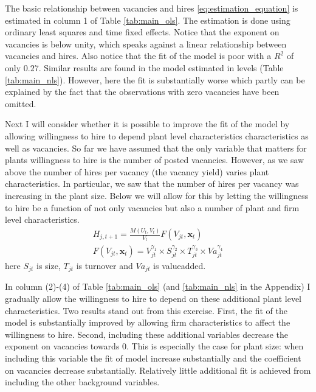 The basic relationship between vacancies and hires \eqref{eq:estimation_equation} is estimated in column 1 of Table \ref{tab:main_ols}. The estimation is done using ordinary least squares and time fixed effects. Notice that the exponent on vacancies is below unity, which speaks against a linear relationship between vacancies and hires. Also notice that the fit of the model is poor with a $R^2$ of only $0.27$. Similar results are found in the model estimated in levels (Table \ref{tab:main_nls}). However, here the fit is substantially worse which partly can be explained by the fact that the observations with zero vacancies have been omitted. 



Next I will consider whether it is possible to improve the fit of the model by allowing willingness to hire to depend plant level characteristics characteristics as well as vacancies. So far we have assumed that the only variable that matters for plants willingness to hire is the number of posted vacancies. However, as we saw above the number of hires per vacancy (the vacancy yield) varies plant characteristics. In particular, we saw that the number of hires per vacancy was increasing in the plant size. Below we will allow for this by letting the willingness to hire be a function of not only vacancies but also a number of plant and firm level characteristics.
\begin{align}
H_{j,t+1}=\frac{M(U_t, V_t)}{V_t} F\left( V_{jt}, \mathbf{x}_t \right) \\
F(V_{jt},\mathbf{x}_t)=V_{jt}^{\gamma_1}  \times  S_{jt}^{\gamma_2} \times T_{jt}^{\gamma_3} \times  Va_{jt}^{\gamma_4}
\end{align}
here $S_{jt}$ is size, $T_{jt}$ is turnover and $Va_{jt}$ is valueadded. %

In column (2)-(4) of Table \ref{tab:main_ols} (and \ref{tab:main_nls} in the Appendix) I gradually allow the willingness to hire to depend on these additional plant level characteristics. Two results stand out from this exercise. First, the fit of the model is substantially improved by allowing firm characteristics to affect the willingness to hire. Second, including these additional variables decrease the exponent on vacancies towards $0$. This is especially the case for plant size: when including this variable the fit of model increase substantially and the coefficient on vacancies decrease substantially. Relatively little additional fit is achieved from including the other background variables.  

